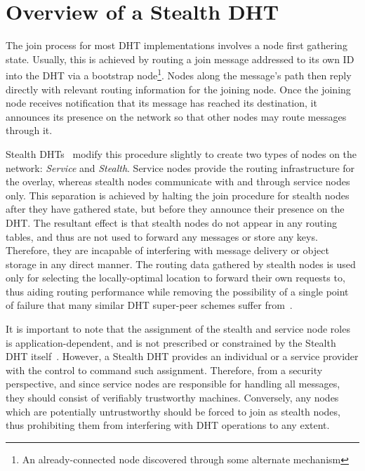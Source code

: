 \documentclass[pdftex,conference,10pt]{IEEEtran}
\begin{document}
\section{Overview of a Stealth DHT}
\label{sect-dhtoverview}

The join process for most DHT implementations involves a node first
gathering state. Usually, this is achieved by routing a join message
addressed to its own ID into the DHT via a bootstrap node\footnote{An
already-connected node discovered through some alternate mechanism}.
Nodes along the message's path then reply directly with relevant
routing information for the joining node. Once the joining node
receives notification that its message has reached its destination, it
announces its presence on the network so that other nodes may route
messages through it.

Stealth DHTs~\cite{Brampton05Stealth} modify this procedure slightly to
create two types of nodes on the network: \emph{Service} and
\emph{Stealth}. Service nodes provide the routing infrastructure for
the overlay, whereas stealth nodes communicate with and through service
nodes only. This separation is achieved by halting the join procedure
for stealth nodes after they have gathered state, but before they
announce their presence on the DHT. The resultant effect is that
stealth nodes do not appear in any routing tables, and thus are not
used to forward any messages or store any keys. Therefore, they are
incapable of interfering with message delivery or object storage in any
direct manner. The routing data gathered by stealth nodes is used only
for selecting the locally-optimal location to forward their own
requests to, thus aiding routing performance while removing the
possibility of a single point of failure that many similar DHT
super-peer schemes suffer from~\cite{Mizrak03Structured}.

It is important to note that the assignment of the stealth and service
node roles is application-dependent, and is not prescribed or
constrained by the Stealth DHT itself~\cite{Brampton05Stealth}.
However, a Stealth DHT provides an individual or a service provider
with the control to command such assignment. Therefore, from a security
perspective, and since service nodes are responsible for handling all
messages, they should consist of verifiably trustworthy machines.
Conversely, any nodes which are potentially untrustworthy should be
forced to join as stealth nodes, thus prohibiting them from interfering
with DHT operations to any extent.
\end{document}
